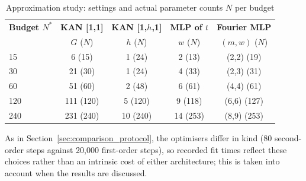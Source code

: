{\begin{table}[h]
\centering\JOY
\caption{Approximation study: settings and actual parameter counts \(N\) per budget}
\label{tab:approx_config}
\small
\begin{tabular}{lcccc}
\hline
\textbf{Budget \(N^{*}\)} & \textbf{KAN [1,1]} & \textbf{KAN [1,\(h\),1]} & \textbf{MLP of \(t\)} & \textbf{Fourier MLP} \\
 & \(G\) (\(N\)) & \(h\) (\(N\)) & \(w\) (\(N\)) & \((m,w)\) (\(N\)) \\
\hline
15  & 6 (15)    & 1 (24)   & 2 (13)   & (2,2) (19)  \\
30  & 21 (30)   & 1 (24)   & 4 (33)   & (2,3) (31)  \\
60  & 51 (60)   & 2 (48)   & 6 (61)   & (4,4) (61)  \\
120 & 111 (120) & 5 (120)  & 9 (118)  & (6,6) (127) \\
240 & 231 (240) & 10 (240) & 14 (253) & (8,9) (253) \\
\hline
\end{tabular}
\end{table}

As in Section~\ref{sec:comparison_protocol}, the optimisers differ in
kind (80 second-order steps against 20{,}000 first-order steps), so
recorded fit times reflect these choices rather than an intrinsic cost
of either architecture; this is taken into account when the results
are discussed.
}
